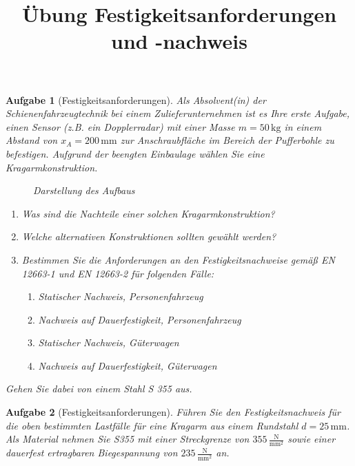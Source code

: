 \documentclass[11pt,a4paper,headsepline]{scrartcl}
\title{\"Ubung Festigkeitsanforderungen und -nachweis}
\date{}
\newtheorem{aufgabe}{Aufgabe}
\begin{document}
\maketitle
\thispagestyle{fancy}
\pagestyle{fancy}
\vspace{-2cm}

\begin{aufgabe}[Festigkeitsanforderungen] 
\label{Ta:Festigkeit}
Als Absolvent(in) der Schienenfahrzeugtechnik bei einem Zulieferunternehmen ist es Ihre erste Aufgabe, einen Sensor (z.B. ein Dopplerradar) mit einer Masse $m = 50 \, \mathrm{kg}$ in einem Abstand von $x_{A} = 200 \, \mathrm{mm}$ zur Anschraubfl\"ache im Bereich der Pufferbohle zu befestigen. Aufgrund der beengten Einbaulage w\"ahlen Sie eine Kragarmkonstruktion.
\begin{figure}[htbp]
\begin{center}
\caption{Darstellung des Aufbaus}
\label{Fig:Festigkeit}
\end{center}
\end{figure}

\begin{enumerate}
		\item Was sind die Nachteile einer solchen Kragarmkonstruktion?
		\item Welche alternativen Konstruktionen sollten gew\"ahlt werden?
		\item Bestimmen Sie die Anforderungen an den Festigkeitsnachweise gem\"a{\ss} EN 12663-1 und EN 12663-2 f\"ur folgenden F\"alle:
		\begin{enumerate}
		\item Statischer Nachweis, Personenfahrzeug
		\item Nachweis auf Dauerfestigkeit, Personenfahrzeug
		\item Statischer Nachweis, G\"uterwagen
		\item Nachweis auf Dauerfestigkeit, G\"uterwagen
		\end{enumerate}
\end{enumerate}
Gehen Sie dabei von einem Stahl S 355 aus.
\end{aufgabe}

\begin{aufgabe}[Festigkeitsanforderungen] 
\label{Ta:Nachweis}
F\"uhren Sie den Festigkeitsnachweis f\"ur die oben bestimmten Lastf\"alle f\"ur eine Kragarm aus einem Rundstahl $d = 25 \, \mathrm{mm}$. Als Material nehmen Sie  S355 mit einer Streckgrenze von $355\, \frac{\mathrm{N}}{\mathrm{mm}^2}$ sowie einer dauerfest ertragbaren Biegespannung von $235\, \frac{\mathrm{N}}{\mathrm{mm}^2}$ an.
\end{aufgabe}
\end{document}
